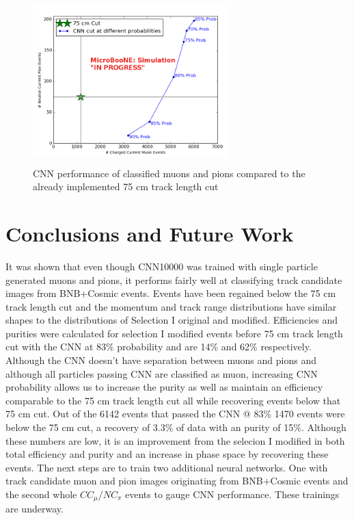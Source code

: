 \begin{figure}[htp!]
\centering
\includegraphics[width=3in,height=2.5in]{figs/cnn_performance.png}
\caption{CNN performance of classified muons and pions compared to the already implemented 75 cm track length cut}
\label{fig:sel1mod_cnnperformance}
\end{figure}

\section{Conclusions and Future Work}

It was shown that even though CNN10000 was trained with single particle generated muons and pions, it performs fairly well at classifying track candidate images from BNB+Cosmic events. Events have been regained below the 75 cm track length cut and the momentum and track range distributions have similar shapes to the distributions of Selection I original and modified. Efficiencies and purities were calculated for selection I modified events before 75 cm track length cut  with the CNN at 83\% probability and are 14\% and 62\% respectively. Although the CNN doesn't have separation between muons and pions and although all particles passing CNN are classified as muon, increasing CNN probability allows us to increase the purity as well as maintain an efficiency comparable to the 75 cm track length cut all while recovering events below that 75 cm cut. Out of the 6142 events that passed the CNN @ 83\% 1470 events were below the 75 cm cut, a recovery of 3.3\% of data with an purity of 15\%. Although these numbers are low, it is an improvement from the selecion I modified in both total efficiency and purity and an increase in phase space by recovering these events. The next steps are to train two additional neural networks. One with track candidate muon and pion images originating from BNB+Cosmic events and the second whole $CC_{\mu}/NC_{\pi}$ events to gauge CNN performance. These trainings are underway.

\clearpage

